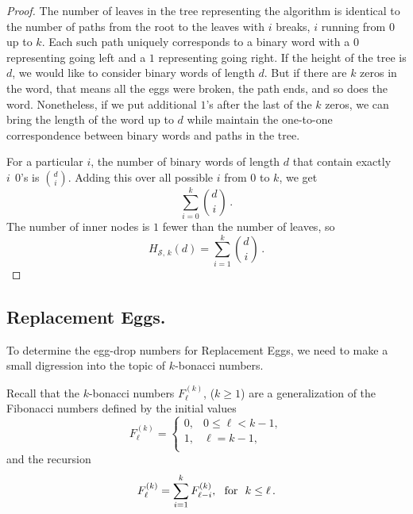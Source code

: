 \documentclass[12pt]{amsart}
\theoremstyle{definition}
\theoremstyle{theorem}
\begin{document}
\begin{proof}
The number of leaves in the 
tree representing the algorithm
is identical to the number of paths from the root to the leaves with $i$ breaks,
$i$ running from $0$ up to $k$.  Each such path uniquely corresponds to a binary word
with a $0$ representing going left and a $1$ representing going right. If the height of the
tree is $d$, we would like to consider binary words of length $d$.  But if there are $k$ zeros in the word,
that means all the eggs were broken, the path ends, and so does the word. 
Nonetheless, if we put additional $1$'s after the last of the $k$ zeros, we can bring the length
of the word up to $d$ while maintain the one-to-one correspondence between binary words and paths
in the tree.

For a particular $i$,  the number of binary words of length $d$ that
contain exactly $i\ \ 0$'s is  $\binom{d}{i}$. 
Adding this over all possible $i$ from $0$ to $k$, we get
\[
\sum_{i=0}^k  \binom{d}{i}
\,.
\]
The number of inner nodes is $1$ fewer than the number of leaves, so
\[
H_{{\mathcal S},\,k}(d) =  \sum_{i=1}^k  \binom{d}{i}
\,.
\]
\end{proof}

\subsection{Replacement Eggs.}
To determine the egg-drop numbers for Replacement Eggs, we need to make 
a small digression into the topic of $k$-bonacci numbers.

Recall that the $k$-bonacci numbers $F_\ell^{(k)}$, ($k \geq 1$) are a generalization of
the Fibonacci numbers  defined by the initial values
\begin{equation}\label{fib.init}
F_\ell^{(k)} = 
\begin{cases}
       0, & 0 \le \ell<k-1, \\
       1, & \ell=k-1, \\
\end{cases}
\end{equation}
and the recursion
\begin{equation}\label{fib.recur}
F_\ell^{(k)} =  \sum_{i=1}^k F_{\ell-i}^{(k)},\hbox{\rm\ \ for\ \ }k\leq \ell
\,.
\end{equation}
\end{document}
